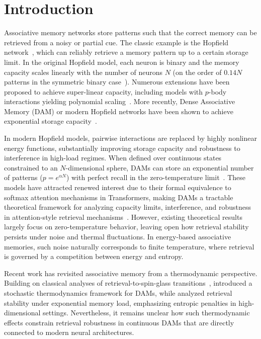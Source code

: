 \documentclass{article}
\theoremstyle{plain}
\theoremstyle{definition}
\theoremstyle{remark}
\begin{document}
\section{Introduction}

Associative memory networks store patterns such that the correct memory can be retrieved from a noisy or partial cue. The classic example is the Hopfield network~\citep{Hopfield1982}, which can reliably retrieve a memory pattern up to a certain storage limit. In the original Hopfield model, each neuron is binary and the memory capacity scales linearly with the number of neurons $N$ (on the order of $0.14N$ patterns in the symmetric binary case~\citep{amit1985storing}). Numerous extensions have been proposed to achieve super-linear capacity, including models with $p$-body interactions yielding polynomial scaling~\citep{gardner1988space,KrotovHopfield2016}. More recently, Dense Associative Memory (DAM) or modern Hopfield networks have been shown to achieve exponential storage capacity~\citep{demircigil2017model,ramsauer2021hopfield}.

In modern Hopfield models, pairwise interactions are replaced by highly nonlinear energy functions, substantially improving storage capacity and robustness to interference in high-load regimes. When defined over continuous states constrained to an $N$-dimensional sphere, DAMs can store an exponential number of patterns ($p = e^{\alpha N}$) with perfect recall in the zero-temperature limit~\citep{demircigil2017model,ramsauer2021hopfield,lucibello2024exponential}. These models have attracted renewed interest due to their formal equivalence to softmax attention mechanisms in Transformers, making DAMs a tractable theoretical framework for analyzing capacity limits, interference, and robustness in attention-style retrieval mechanisms~\citep{ramsauer2021hopfield}. However, existing theoretical results largely focus on zero-temperature behavior, leaving open how retrieval stability persists under noise and thermal fluctuations. In energy-based associative memories, such noise naturally corresponds to finite temperature, where retrieval is governed by a competition between energy and entropy.

Recent work has revisited associative memory from a thermodynamic perspective. Building on classical analyses of retrieval-to-spin-glass transitions~\citep{amit1987statistical}, \citet{rooke2026stochastic} introduced a stochastic thermodynamics framework for DAMs, while \citet{lucibello2024exponential} analyzed retrieval stability under exponential memory load, emphasizing entropic penalties in high-dimensional settings. Nevertheless, it remains unclear how such thermodynamic effects constrain retrieval robustness in continuous DAMs that are directly connected to modern neural architectures.
\end{document}
